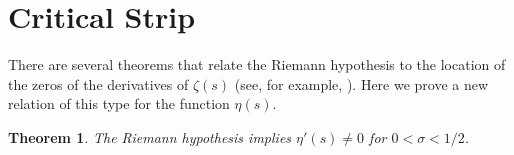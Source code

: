 \documentclass{amsart}
\theoremstyle{plain}
\newtheorem{theorem}{Theorem}[section]
\theoremstyle{definition}
\newcommand{\fixme}[1]{{\color{purple}FIXME: #1}}
\begin{document}





\section{Critical Strip}\label{sec eta critical}

There are several theorems that relate the Riemann hypothesis to the location of the zeros of the derivatives of $\zeta(s)$ (see, for example, \cite{s:5,lm:1}). 
Here we prove a new relation of this type for the function $\eta(s)$.
\begin{theorem}
The Riemann hypothesis implies $\eta'(s)\ne 0$ for $0< \sigma< 1/2$.
\end{theorem}
\end{document}
